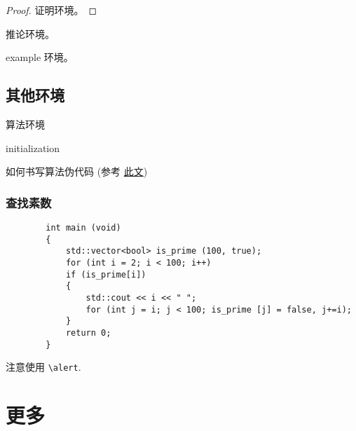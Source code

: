 \begin{frame}
    \begin{proof} 
        证明环境。
    \end{proof}
    
    \begin{corollary}
        推论环境。
    \end{corollary}
    
    \begin{example}
        example 环境。
    \end{example}

\end{frame}

\subsection{其他环境}

\begin{frame}{算法环境}
    \scriptsize
    \begin{algorithm}[H]
        initialization\;
        \caption{如何书写算法伪代码
        (参考 \href{https://en.wikibooks.org/wiki/LaTeX/Algorithms}{此文})}
        \end{algorithm}
\end{frame}

\begin{frame}[fragile]
    \frametitle{查找素数}
    \scriptsize
    \begin{verbatim}
        int main (void)
        {
            std::vector<bool> is_prime (100, true);
            for (int i = 2; i < 100; i++)
            if (is_prime[i])
            {
                std::cout << i << " ";
                for (int j = i; j < 100; is_prime [j] = false, j+=i);
            }
            return 0;
        }
    \end{verbatim}

    \vspace{-0.7cm}

    \begin{uncoverenv}
    注意使用 \verb|\alert|.
    \end{uncoverenv}
\end{frame}

\section{更多}

